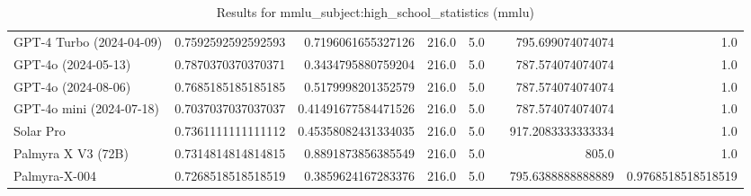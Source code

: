 \begin{table}[htp]
{\begin{tabular}{lrrrrrrr}
GPT-4 Turbo (2024-04-09) & 0.7592592592592593 & 0.7196061655327126 & 216.0 & 5.0 &  & 795.699074074074 & 1.0 \\
GPT-4o (2024-05-13) & 0.7870370370370371 & 0.3434795880759204 & 216.0 & 5.0 &  & 787.574074074074 & 1.0 \\
GPT-4o (2024-08-06) & 0.7685185185185185 & 0.5179998201352579 & 216.0 & 5.0 &  & 787.574074074074 & 1.0 \\
GPT-4o mini (2024-07-18) & 0.7037037037037037 & 0.41491677584471526 & 216.0 & 5.0 &  & 787.574074074074 & 1.0 \\
Solar Pro & 0.7361111111111112 & 0.45358082431334035 & 216.0 & 5.0 &  & 917.2083333333334 & 1.0 \\
Palmyra X V3 (72B) & 0.7314814814814815 & 0.8891873856385549 & 216.0 & 5.0 &  & 805.0 & 1.0 \\
Palmyra-X-004 & 0.7268518518518519 & 0.3859624167283376 & 216.0 & 5.0 &  & 795.6388888888889 & 0.9768518518518519 \\
\bottomrule
\end{tabular}}
\caption{Results for mmlu_subject:high_school_statistics (mmlu)}
\label{fig:mmlu_subject:high_school_statistics (mmlu)}
\end{table}